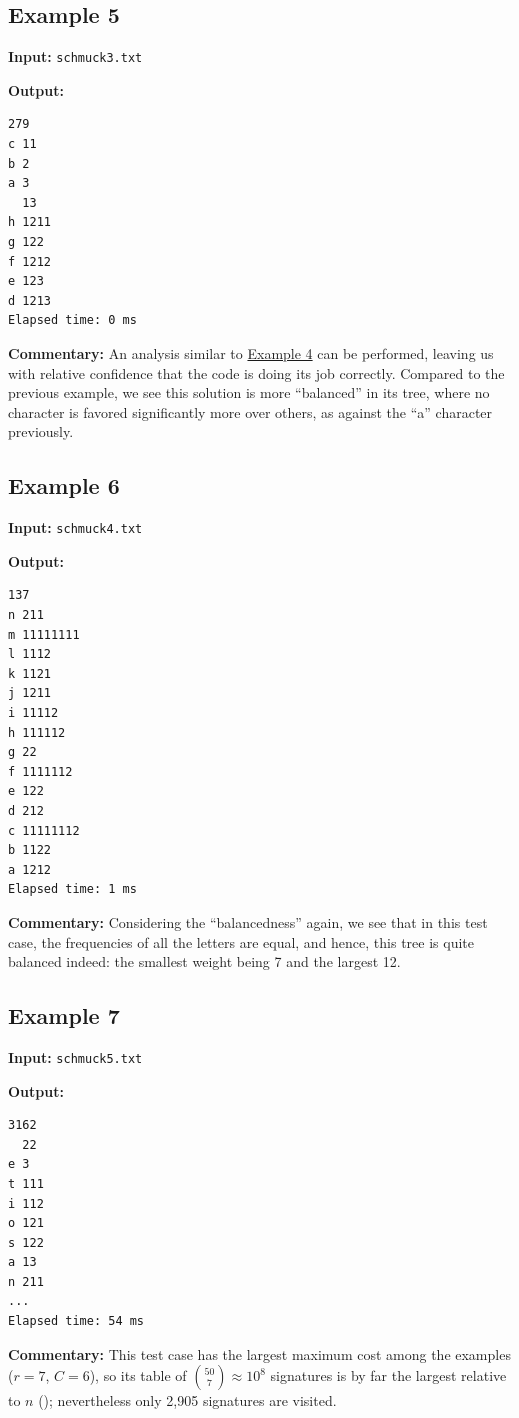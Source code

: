 \documentclass[a4paper,10pt,english]{scrartcl}
\begin{document}
\subsection{Example 5}\label{ex:5}

\textbf{Input:} \texttt{schmuck3.txt}

\textbf{Output:}

\begin{verbatim}
279
c 11
b 2
a 3
  13
h 1211
g 122
f 1212
e 123
d 1213
Elapsed time: 0 ms
\end{verbatim}

\textbf{Commentary:} An analysis similar to \hyperref[ex:4]{Example 4} can be performed, leaving us with relative confidence that the code is doing its job correctly. Compared to the previous example, we see this solution is more ``balanced'' in its tree, where no character is favored significantly more over others, as against the ``a'' character previously.

\subsection{Example 6}\label{ex:6}
\textbf{Input:} \texttt{schmuck4.txt}

\textbf{Output:}

\begin{verbatim}
137
n 211
m 11111111
l 1112
k 1121
j 1211
i 11112
h 111112
g 22
f 1111112
e 122
d 212
c 11111112
b 1122
a 1212
Elapsed time: 1 ms
\end{verbatim}

\textbf{Commentary:} Considering the ``balancedness'' again, we see that in this test case, the frequencies of all the letters are equal, and hence, this tree is quite balanced indeed: the smallest weight being 7 and the largest 12. 

\subsection{Example 7}\label{ex:7}
\textbf{Input:} \texttt{schmuck5.txt}

\textbf{Output:}
\begin{verbatim}
3162
  22
e 3
t 111
i 112
o 121
s 122
a 13
n 211
...
Elapsed time: 54 ms
\end{verbatim}

\textbf{Commentary:} This test case has the largest maximum cost among the examples ($r = 7$, $C = 6$), so its table of $\binom{50}{7} \approx 10^8$ signatures is by far the largest relative to $n$ (); nevertheless only 2{,}905 signatures are visited.
\end{document}
